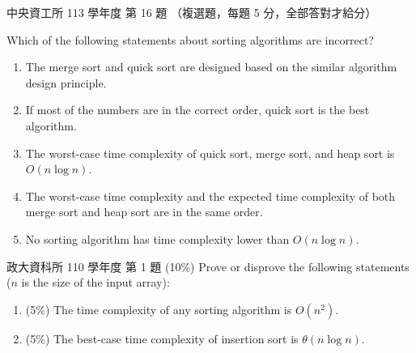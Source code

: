 \begin{pastexam}[label={px:so-1}]{中央資工所 113 學年度 第 16 題}
（複選題，每題 5 分，全部答對才給分）

Which of the following statements about sorting algorithms are incorrect?
\begin{enumerate}[label=(\Alph*)]
\item The merge sort and quick sort are designed based on the similar algorithm design principle.
\item If most of the numbers are in the correct order, quick sort is the best algorithm.
\item The worst-case time complexity of quick sort, merge sort, and heap sort is $O(n\log n)$.
\item The worst-case time complexity and the expected time complexity of both merge sort and heap sort are in the same order.
\item No sorting algorithm has time complexity lower than $O(n\log n)$.
\end{enumerate}
\end{pastexam}

\begin{pastexam}[label={px:so-2}]{政大資科所 110 學年度 第 1 題}
(10\%) Prove or disprove the following statements ($n$ is the size of the input array):
\begin{enumerate}[label=\alph*.]
\item (5\%) The time complexity of any sorting algorithm is $O(n^2)$.
\item (5\%) The best-case time complexity of insertion sort is $\theta(n\log n)$.
\end{enumerate}
\end{pastexam}

